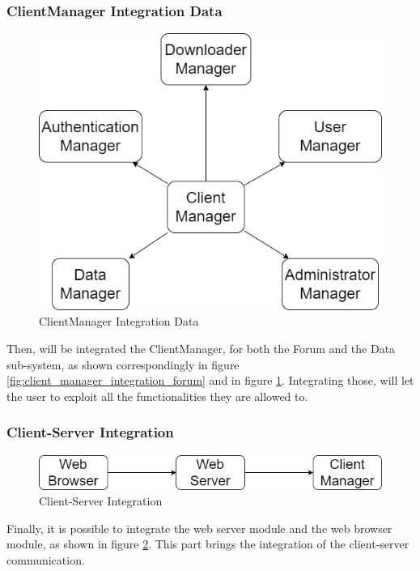 \subsubsection{ClientManager Integration Data}
\begin{figure}[h!]
        \centering
        \includegraphics[scale=0.5]{images/component_integration/client_manager_data_integration.png}
        \caption{ClientManager Integration Data}
        \label{fig:client_manager_integration_data}
\end{figure}
\FloatBarrier

Then, will be integrated the ClientManager, for both the Forum and the Data sub-system, as shown correspondingly in figure \ref{fig:client_manager_integration_forum} and in figure \ref{fig:client_manager_integration_data}. Integrating those, will let the user to exploit all the functionalities they are allowed to.

\subsubsection{Client-Server Integration}
\begin{figure}[h!]
        \centering
        \includegraphics[scale=0.5]{images/component_integration/client_server_integration.png}
        \caption{Client-Server Integration}
        \label{fig:client_server_integration}
\end{figure}
\FloatBarrier

Finally, it is possible to integrate the web server module and the web browser module, as shown in figure \ref{fig:client_server_integration}. This part brings the integration of the client-server communication.